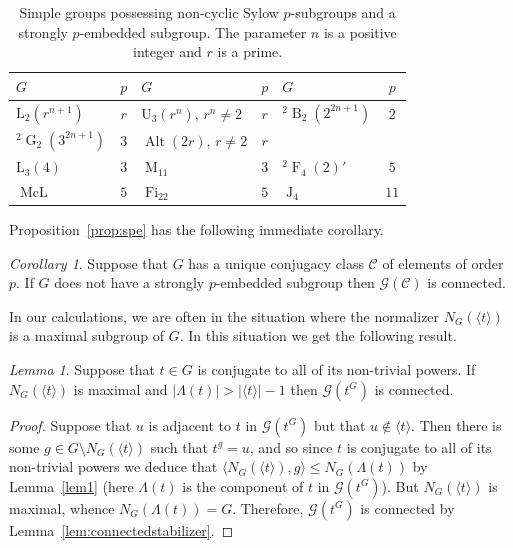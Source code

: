 \documentclass[11pt,a4paper]{amsart}
\theoremstyle{plain}
\theoremstyle{definition}
\theoremstyle{remark}
\newtheorem{corollary}[definition]{Corollary}
\newtheorem{lemma}[definition]{Lemma}
\theoremstyle{remark}
\theoremstyle{remark}
\theoremstyle{definition}
\newcommand{\twist}[1]{%
  {}^{2}\!#1%
}
\newcommand{\GG}{\mathcal{G}}
\DeclareMathOperator{\McL}{McL}
\DeclareMathOperator{\M}{M}
\DeclareMathOperator{\J}{J}
\DeclareMathOperator{\Fi}{Fi}
\DeclareMathOperator{\B}{B}
\DeclareMathOperator{\F}{F}
\DeclareMathOperator{\G}{G}
\DeclareMathOperator{\Alt}{Alt}
\begin{document}
\begin{table}[H]
   \centering
     \begin{tabular}{|lc|lc|lc|}
\hline
$G $                           & $ p $    & $ G $                          & $ p $    & $ G $                  & $ p $ \\\hline
$\mathrm{L}_2(r^{n+1})$ & $r$ & $\mathrm U_3(r^n)$, $r^n\ne 2$ & $r$ & $\twist\B_2(2^{2n+1})$& $2$ \\
$\twist\G_2(3^{2n+1})$           & $3$    & $\Alt(2r)$, $r\ne 2$                     & $r$ &  & \\ \hline
$\mathrm L_3(4)$              & $3$ &$\M_{11} $                     & $ 3$     & $ \twist\F_4(2)' $             & $ 5 $ \\     $ \McL $               & $5 $  &
$ \Fi_{22} $                   & $5 $     & $ \J_4$                        & $11$                               \\ \hline
\end{tabular}
\caption{Simple groups possessing non-cyclic Sylow $p$-subgroups and a strongly $p$-embedded subgroup. The parameter $n$ is a positive integer and $r$ is a prime.}
\label{tbl:spe}
\end{table}

Proposition~\ref{prop:spe} has the following immediate corollary.

\begin{corollary}\label{propconsequences} Suppose that $G$ has a unique conjugacy class $\mathcal{C}$ of elements of order $p$. If $G$ does not have a strongly $p$-embedded subgroup then $\GG(\mathcal{C})$ is connected.
\end{corollary}

In our calculations, we are often in the situation where the normalizer $N_G(\langle t\rangle)$ is a maximal subgroup of $G$. In this situation we get the following result.

\begin{lemma}\label{lem:maxcent}
Suppose that $t\in G$ is conjugate to all of its non-trivial powers. If $N_G(\langle t\rangle)$ is maximal and $|\Lambda(t)|>|\langle t\rangle |-1$ then $\GG(t^G)$ is connected.
\end{lemma} 
\begin{proof}
Suppose that $u$ is adjacent to $t$ in $\GG(t^G)$ but that $u\not\in\langle t\rangle$. Then there is some $g\in G\setminus N_G(\langle t\rangle)$ such that $t^g=u$, and so since $t$ is conjugate to all of its non-trivial powers we deduce that $\langle N_G(\langle t\rangle),g\rangle\leq N_G(\Lambda(t))$ by Lemma~\ref{lem1} (here $\Lambda(t)$ is the component of $t$ in $\GG(t^G)$). But $N_G(\langle t\rangle)$ is maximal, whence $N_G(\Lambda(t))=G$. Therefore, $\GG(t^G)$ is connected by Lemma~\ref{lem:connectedstabilizer}.
\end{proof}
\end{document}
